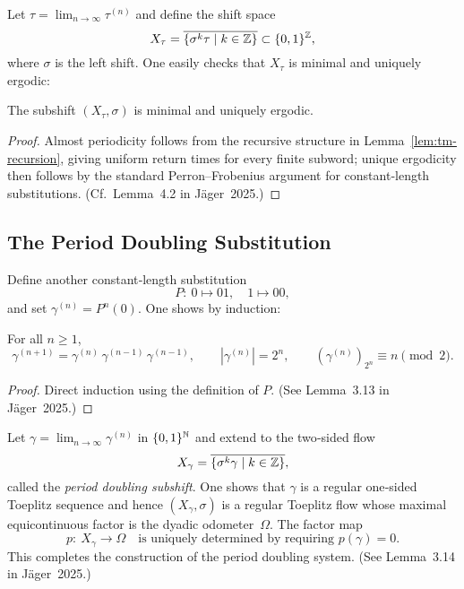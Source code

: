 Let $\tau=\lim_{n\to\infty}\tau^{(n)}$ and define the shift space
\[
X_\tau = \overline{\{\sigma^k \tau\mid k\in\mathbb{Z}\}}\subset\{0,1\}^{\mathbb{Z}},
\]
where $\sigma$ is the left shift.  One easily checks that $X_\tau$ is minimal and uniquely ergodic:
\begin{lemma}\label{lem:tm-ergodic}
The subshift $(X_\tau,\sigma)$ is minimal and uniquely ergodic.
\end{lemma}
\begin{proof}
Almost periodicity follows from the recursive structure in Lemma~\ref{lem:tm-recursion}, giving uniform return times for every finite subword; unique ergodicity then follows by the standard Perron–Frobenius argument for constant‑length substitutions.  (Cf. Lemma 4.2 in Jäger 2025.)
\end{proof}

\subsection{The Period Doubling Substitution}
Define another constant‑length substitution
\[
P:\ 0 \mapsto 01,\quad 1 \mapsto 00,
\]
and set $\gamma^{(n)}=P^n(0)$.  One shows by induction:
\begin{lemma}\label{lem:pd-recursion}
For all $n\ge1$,
\[
\gamma^{(n+1)} = \gamma^{(n)}\,\gamma^{(n-1)}\,\gamma^{(n-1)},
\qquad |\gamma^{(n)}|=2^n,
\qquad (\gamma^{(n)})_{2^n}\equiv n\pmod2.
\]
\end{lemma}
\begin{proof}
Direct induction using the definition of $P$.  (See Lemma 3.13 in Jäger 2025.)
\end{proof}

Let $\gamma=\lim_{n\to\infty}\gamma^{(n)}$ in $\{0,1\}^{\mathbb{N}}$ and extend to the two‑sided flow
\[
X_\gamma=\overline{\{\sigma^k\gamma\mid k\in\mathbb{Z}\}},
\]
called the \emph{period doubling subshift}.  One shows that $\gamma$ is a regular one‑sided
Toeplitz sequence and hence $(X_\gamma,\sigma)$ is a regular Toeplitz flow whose maximal equi\-con\-ti\-nuous factor is the dyadic odometer~$\Omega$.  The factor map
\[
p:\ X_\gamma\to\Omega
\quad\text{is uniquely determined by requiring }p(\gamma)=0.
\]
This completes the construction of the period doubling system.  (See Lemma 3.14 in Jäger 2025.)


